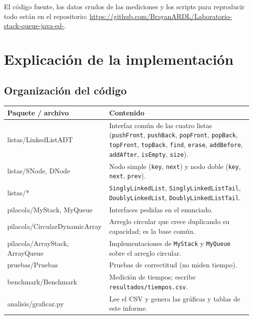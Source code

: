 \documentclass[11pt,a4paper]{article}
\newcommand{\repositorio}{https://github.com/BrayanARDL/Laboratorio-stack-queue-java-ed-}
\begin{document}
El código fuente, los datos crudos de las mediciones y los scripts para reproducir todo están en el
repositorio: \url{\repositorio}.

\section{Explicación de la implementación}

\subsection{Organización del código}

\begin{table}[H]\centering\small
\begin{tabularx}{\linewidth}{>{\ttfamily}l X}
\toprule
\normalfont\textbf{Paquete / archivo} & \textbf{Contenido} \\
\midrule
listas/LinkedListADT & Interfaz común de las cuatro listas (\texttt{pushFront}, \texttt{pushBack}, \texttt{popFront}, \texttt{popBack}, \texttt{topFront}, \texttt{topBack}, \texttt{find}, \texttt{erase}, \texttt{addBefore}, \texttt{addAfter}, \texttt{isEmpty}, \texttt{size}). \\
listas/SNode, DNode & Nodo simple (\texttt{key}, \texttt{next}) y nodo doble (\texttt{key}, \texttt{next}, \texttt{prev}). \\
listas/* & \texttt{SinglyLinkedList}, \texttt{SinglyLinkedListTail}, \texttt{DoublyLinkedList}, \texttt{DoublyLinkedListTail}. \\
pilacola/MyStack, MyQueue & Interfaces pedidas en el enunciado. \\
pilacola/CircularDynamicArray & Arreglo circular que crece duplicando su capacidad; es la base común. \\
pilacola/ArrayStack, ArrayQueue & Implementaciones de \texttt{MyStack} y \texttt{MyQueue} sobre el arreglo circular. \\
pruebas/Pruebas & Pruebas de correctitud (no miden tiempo). \\
benchmark/Benchmark & Medición de tiempos; escribe \texttt{resultados/tiempos.csv}. \\
analisis/graficar.py & Lee el CSV y genera las gráficas y tablas de este informe. \\
\bottomrule
\end{tabularx}
\end{table}
\end{document}
